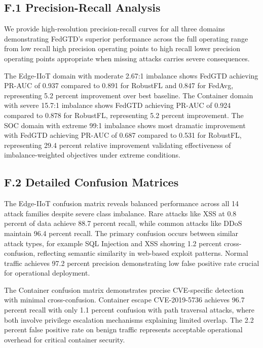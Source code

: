 \documentclass[12pt,a4paper]{article}
\theoremstyle{definition}
\begin{document}
\subsection{F.1 Precision-Recall Analysis}

We provide high-resolution precision-recall curves for all three domains demonstrating FedGTD's superior performance across the full operating range from low recall high precision operating points to high recall lower precision operating points appropriate when missing attacks carries severe consequences.

The Edge-IIoT domain with moderate 2.67:1 imbalance shows FedGTD achieving PR-AUC of 0.937 compared to 0.891 for RobustFL and 0.847 for FedAvg, representing 5.2 percent improvement over best baseline. The Container domain with severe 15.7:1 imbalance shows FedGTD achieving PR-AUC of 0.924 compared to 0.878 for RobustFL, representing 5.2 percent improvement. The SOC domain with extreme 99:1 imbalance shows most dramatic improvement with FedGTD achieving PR-AUC of 0.687 compared to 0.531 for RobustFL, representing 29.4 percent relative improvement validating effectiveness of imbalance-weighted objectives under extreme conditions.

\subsection{F.2 Detailed Confusion Matrices}

The Edge-IIoT confusion matrix reveals balanced performance across all 14 attack families despite severe class imbalance. Rare attacks like XSS at 0.8 percent of data achieve 88.7 percent recall, while common attacks like DDoS maintain 96.4 percent recall. The primary confusion occurs between similar attack types, for example SQL Injection and XSS showing 1.2 percent cross-confusion, reflecting semantic similarity in web-based exploit patterns. Normal traffic achieves 97.2 percent precision demonstrating low false positive rate crucial for operational deployment.

The Container confusion matrix demonstrates precise CVE-specific detection with minimal cross-confusion. Container escape CVE-2019-5736 achieves 96.7 percent recall with only 1.1 percent confusion with path traversal attacks, where both involve privilege escalation mechanisms explaining limited overlap. The 2.2 percent false positive rate on benign traffic represents acceptable operational overhead for critical container security.
\end{document}
